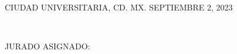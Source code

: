 \documentclass[11pt,letterpaper,twoside,openright]{report}
\begin{document}
\begin{titlepage}
\begin{center}
		\vspace{1.8cm}
		CIUDAD UNIVERSITARIA, CD. MX. SEPTIEMBRE 2, 2023\\
	\end{center}
	
\end{titlepage}


\newpage
\thispagestyle{empty}
$\ $


\newpage
\thispagestyle{empty}
\vspace{30mm}

\noindent JURADO ASIGNADO:
\vspace{8mm}
\end{document}
